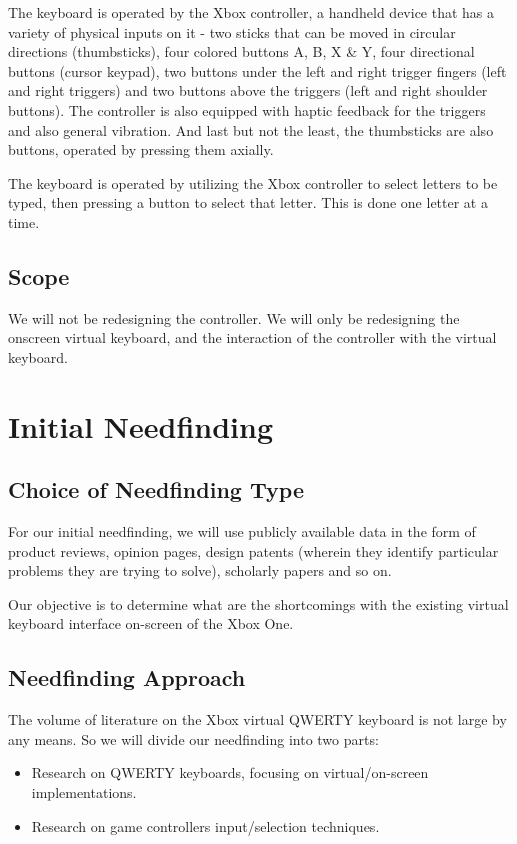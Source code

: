 \documentclass[
	letterpaper, %
]{jdf}
\begin{document}
The keyboard is operated by the Xbox controller, a handheld device that has a variety of physical inputs on it - two sticks that can be moved in circular directions (thumbsticks), four colored buttons A, B, X \& Y, four directional buttons (cursor keypad), two buttons under the left and right trigger fingers (left and right triggers) and two buttons above the triggers (left and right shoulder buttons). The controller is also equipped with haptic feedback for the triggers and also general vibration. And last but not the least, the thumbsticks are also buttons, operated by pressing them axially.

The keyboard is operated by utilizing the Xbox controller to select letters to be typed, then pressing a button to select that letter. This is done one letter at a time.

\subsection{Scope}
We will not be redesigning the controller. We will only be redesigning the onscreen virtual keyboard, and the interaction of the controller with the virtual keyboard.

\section{Initial Needfinding}
\subsection{Choice of Needfinding Type}
For our initial needfinding, we will use publicly available data in the form of product reviews, opinion pages, design patents (wherein they identify particular problems they are trying to solve), scholarly papers and so on.

Our objective is to determine what are the shortcomings with the existing virtual keyboard interface on-screen of the Xbox One. 

\subsection{Needfinding Approach}
The volume of literature on the Xbox virtual QWERTY keyboard is not large by any means. So we will divide our needfinding into two parts:
\begin{itemize}
    \item Research on QWERTY keyboards, focusing on virtual/on-screen implementations.
    \item Research on game controllers input/selection techniques.
\end{itemize}
\end{document}
